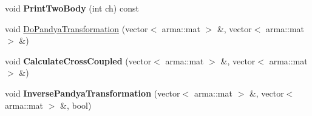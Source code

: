 \begin{DoxyCompactItemize}
\item 
\hypertarget{classOperator_a905e42cefafaca0eb155cf41b3cd37b8}{void {\bfseries Print\-Two\-Body} (int ch) const }\label{classOperator_a905e42cefafaca0eb155cf41b3cd37b8}

\item 
void \hyperlink{classOperator_ad468922e03d15318c23886e6bfecc168}{Do\-Pandya\-Transformation} (vector$<$ arma\-::mat $>$ \&, vector$<$ arma\-::mat $>$ \&)
\item 
\hypertarget{classOperator_aa9082f11f4b3aaf4bb08c058c4dca707}{void {\bfseries Calculate\-Cross\-Coupled} (vector$<$ arma\-::mat $>$ \&, vector$<$ arma\-::mat $>$ \&)}\label{classOperator_aa9082f11f4b3aaf4bb08c058c4dca707}

\item 
\hypertarget{classOperator_ae7827c8ef5240bd3436be60bd5632900}{void {\bfseries Inverse\-Pandya\-Transformation} (vector$<$ arma\-::mat $>$ \&, vector$<$ arma\-::mat $>$ \&, bool)}\label{classOperator_ae7827c8ef5240bd3436be60bd5632900}


\end{DoxyCompactItemize}
